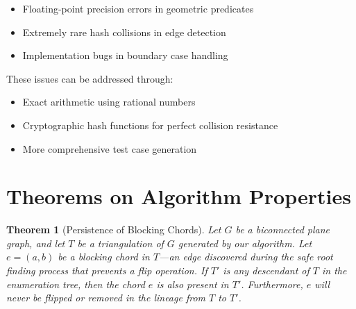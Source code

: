 \documentclass[12pt,a4paper]{article}
\newtheorem{theorem}{Theorem}
\begin{document}
\begin{itemize}
    \item Floating-point precision errors in geometric predicates
    \item Extremely rare hash collisions in edge detection
    \item Implementation bugs in boundary case handling
\end{itemize}

These issues can be addressed through:
\begin{itemize}
    \item Exact arithmetic using rational numbers
    \item Cryptographic hash functions for perfect collision resistance  
    \item More comprehensive test case generation
\end{itemize}

\section{Theorems on Algorithm Properties}

\begin{theorem}[Persistence of Blocking Chords]
Let $G$ be a biconnected plane graph, and let $T$ be a triangulation of $G$ generated by our algorithm. Let $e = (a,b)$ be a blocking chord in $T$---an edge discovered during the safe root finding process that prevents a flip operation. If $T'$ is any descendant of $T$ in the enumeration tree, then the chord $e$ is also present in $T'$. Furthermore, $e$ will never be flipped or removed in the lineage from $T$ to $T'$.
\end{theorem}
\end{document}
